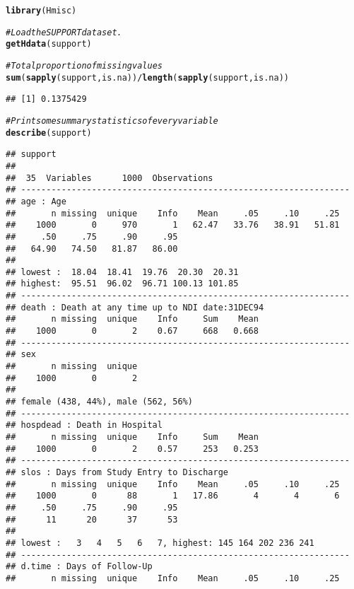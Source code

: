 \documentclass[headinclude=false]{scrartcl}\usepackage[]{graphicx}\usepackage[]{color}
\makeatletter
\newcommand{\hlcom}[1]{\textcolor[rgb]{0.678,0.584,0.686}{\textit{#1}}}%
\newcommand{\hlopt}[1]{\textcolor[rgb]{0,0,0}{#1}}%
\newcommand{\hlstd}[1]{\textcolor[rgb]{0.345,0.345,0.345}{#1}}%
\newcommand{\hlkwd}[1]{\textcolor[rgb]{0.737,0.353,0.396}{\textbf{#1}}}%
\newenvironment{kframe}{%
 \def\at@end@of@kframe{}%
 \ifinner\ifhmode%
  \def\at@end@of@kframe{\end{minipage}}%
  \begin{minipage}{\columnwidth}%
 \fi\fi%
 \def\FrameCommand##1{\hskip\@totalleftmargin \hskip-\fboxsep
 \colorbox{shadecolor}{##1}\hskip-\fboxsep
     \hskip-\linewidth \hskip-\@totalleftmargin \hskip\columnwidth}%
 \MakeFramed {\advance\hsize-\width
   \@totalleftmargin\z@ \linewidth\hsize
   \@setminipage}}%
 {\par\unskip\endMakeFramed%
 \at@end@of@kframe}
\newenvironment{knitrout}{}{} %
\makeatother
\begin{document}
\begin{knitrout}
\color{fgcolor}\begin{kframe}
\begin{alltt}
\hlkwd{library}\hlstd{(Hmisc)}

\hlcom{# Load the SUPPORT data set.}
\hlkwd{getHdata}\hlstd{(support)}

\hlcom{# Total proportion of missing values}
\hlkwd{sum}\hlstd{(}\hlkwd{sapply}\hlstd{(support, is.na))}\hlopt{/}\hlkwd{length}\hlstd{(}\hlkwd{sapply}\hlstd{(support, is.na))}
\end{alltt}
\begin{verbatim}
## [1] 0.1375429
\end{verbatim}
\begin{alltt}
\hlcom{# Print some summary statistics of every variable}
\hlkwd{describe}\hlstd{(support)}
\end{alltt}
\begin{verbatim}
## support 
## 
##  35  Variables      1000  Observations
## -----------------------------------------------------------------
## age : Age 
##       n missing  unique    Info    Mean     .05     .10     .25 
##    1000       0     970       1   62.47   33.76   38.91   51.81 
##     .50     .75     .90     .95 
##   64.90   74.50   81.87   86.00 
## 
## lowest :  18.04  18.41  19.76  20.30  20.31
## highest:  95.51  96.02  96.71 100.13 101.85 
## -----------------------------------------------------------------
## death : Death at any time up to NDI date:31DEC94 
##       n missing  unique    Info     Sum    Mean 
##    1000       0       2    0.67     668   0.668 
## -----------------------------------------------------------------
## sex 
##       n missing  unique 
##    1000       0       2 
## 
## female (438, 44%), male (562, 56%) 
## -----------------------------------------------------------------
## hospdead : Death in Hospital 
##       n missing  unique    Info     Sum    Mean 
##    1000       0       2    0.57     253   0.253 
## -----------------------------------------------------------------
## slos : Days from Study Entry to Discharge 
##       n missing  unique    Info    Mean     .05     .10     .25 
##    1000       0      88       1   17.86       4       4       6 
##     .50     .75     .90     .95 
##      11      20      37      53 
## 
## lowest :   3   4   5   6   7, highest: 145 164 202 236 241 
## -----------------------------------------------------------------
## d.time : Days of Follow-Up 
##       n missing  unique    Info    Mean     .05     .10     .25 

\end{verbatim}
\end{kframe}
\end{knitrout}
\end{document}
